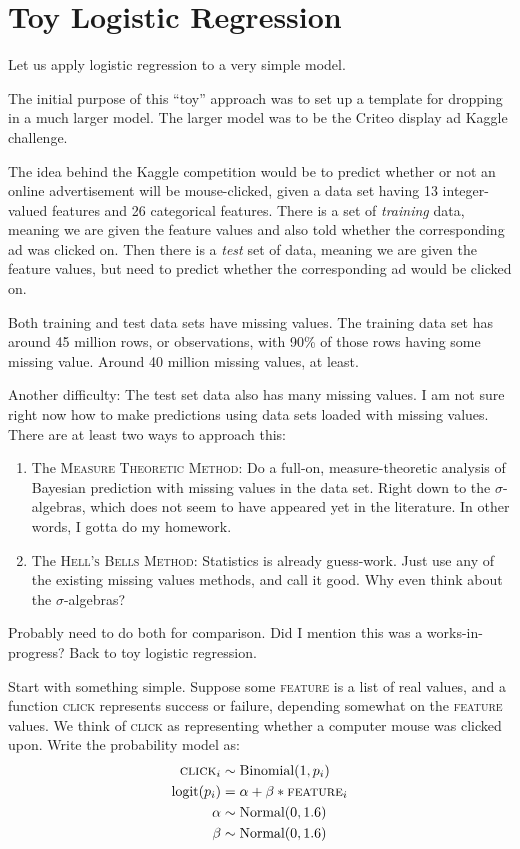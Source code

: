 \documentclass[
twoside=true,
paper=letter,
fontsize=11pt,
pagesize=auto,
leqno,
openany,
headsepline,
overfullrule,
]{scrbook}
\theoremstyle{plain}
\theoremstyle{plain}
\theoremstyle{definition}
\theoremstyle{bfnoteitalic}
\theoremstyle{bfnoteroman}
\newcommand{\textsigma}{\hbox{\large{$\sigma$}}\kern-1pt}
\begin{document}
\section{Toy Logistic Regression}
Let us apply logistic regression to a very simple model.
\begin{quoting}\small{
The initial purpose of this ``toy'' approach was  to set up a template for dropping in a much larger model.
The larger model was to be the Criteo display ad Kaggle challenge.

The idea behind the Kaggle competition would be to predict whether or not an online advertisement will be mouse-clicked, given a data set having 13 integer\hyp{}valued features and 26 categorical features.
There is a set of \emph{training} data, meaning we are given the feature values and also told whether the corresponding ad was clicked on. Then there is a \emph{test} set of data, meaning we are given the feature values, but need to predict whether the corresponding ad would be clicked on.

Both training and test data sets have missing values.  The training data set has around 45 million rows, or observations, with 90\% of those rows having some missing value. Around 40 million missing values, at least.

Another difficulty: The test set data also has many missing values.  I am not sure right now how to make predictions using data sets loaded with missing values.  There are at least two ways to approach this:
\begin{enumerate}
\item
The \textsc{Measure Theoretic Method:}
Do a full-on, measure\hyp{}theoretic analysis  of Bayesian prediction with missing values in the data set.
Right down to the \textsigma\hyp{}algebras, which does not seem to have appeared yet in the literature. In other words, I gotta do my homework.
\item
The \textsc{Hell's Bells Method:}
Statistics is already guess-work. Just use any of the existing missing values methods, and call it good.
Why even think about the \textsigma\hyp{}algebras?
\end{enumerate}
Probably need to do both for comparison.
Did I mention this was a works\hyp{}in\hyp{}progress? Back to toy logistic regression.}
\end{quoting}
Start with something simple.  Suppose some \textsc{feature} is a list of real values, and a function \textsc{click} represents success or failure, depending somewhat on the \textsc{feature} values. We think of \textsc{click} as representing whether a computer mouse was clicked upon.
Write the probability model as:
\begin{align*}
\textsc{click}_i & \sim \text{Binomial}(1,p_i) \\
\text{logit}(p_i) & = \alpha + \beta * \textsc{feature}_i \\
\alpha & \sim \text{Normal}(0, 1.6) \\
\beta & \sim \text{Normal}(0, 1.6) \\
\end{align*}
\end{document}
